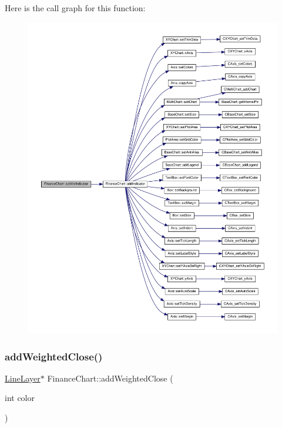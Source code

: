 Here is the call graph for this function\+:
\nopagebreak
\begin{figure}[H]
\begin{center}
\leavevmode
\includegraphics[width=350pt]{class_finance_chart_a51ceb77140f73f49707d526dafe643fe_cgraph}
\end{center}
\end{figure}
\mbox{\label{class_finance_chart_a667247474a92a187877d74ee674f1250}} 
\subsubsection{\texorpdfstring{add\+Weighted\+Close()}{addWeightedClose()}}
{\footnotesize\ttfamily \hyperlink{class_line_layer}{Line\+Layer}$\ast$ Finance\+Chart\+::add\+Weighted\+Close (\begin{DoxyParamCaption}\item[{int}]{color }\end{DoxyParamCaption})\hspace{0.3cm}{\ttfamily [inline]}}



